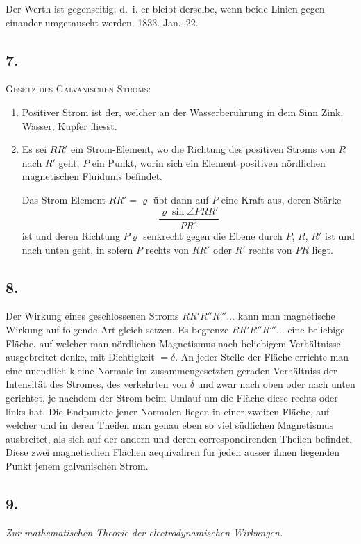 \documentclass[fontsize=10pt,paper=a5,pagesize=auto]{scrbook}
\newcommand{\origpage}[1]{\marginpar{\footnotesize\textit{S. #1}}}
\begin{document}
Der Werth ist gegenseitig, d.~i. er bleibt derselbe, wenn beide Linien gegen einander umgetauscht werden. 1833. Jan.~22.

\subsection*{7.}
\origpage{607}
\textsc{Gesetz des Galvanischen Stroms:}

\begin{enumerate}[label=\arabic*.]
\item Positiver Strom ist der, welcher an der Wasserberührung in dem Sinn Zink, Wasser, Kupfer fliesst.

\item Es sei $RR'$ ein Strom-Element, wo die Richtung des positiven Stroms von $R$ nach $R'$ geht, $P$ ein Punkt, worin sich ein Element positiven nördlichen magnetischen Fluidums befindet.

Das Strom-Element $RR' = \varrho$ übt dann auf $P$ eine Kraft aus, deren Stärke
\[
\frac{\varrho \sin \angle PRR'}{PR^2}
\]
ist und deren Richtung $P\varrho$ senkrecht gegen die Ebene durch $P$, $R$, $R'$ ist und nach unten geht, in sofern $P$ rechts von $RR'$ oder $R'$ rechts von $PR$ liegt.
\end{enumerate}

\subsection*{8.}
\origpage{608}
Der Wirkung eines geschlossenen Stroms $RR'R''R'''\dots$ kann man magnetische Wirkung auf folgende Art gleich setzen. Es begrenze $RR'R''R'''\dots$ eine beliebige Fläche, auf welcher man nördlichen Magnetismus nach beliebigem Verhältnisse ausgebreitet denke, mit Dichtigkeit $= \delta$. An jeder Stelle der Fläche errichte man eine unendlich kleine Normale im zusammengesetzten geraden Verhältniss der Intensität des Stromes, des verkehrten von $\delta$ und zwar nach oben oder nach unten gerichtet, je nachdem der Strom beim Umlauf um die Fläche diese rechts oder links hat. Die Endpunkte jener Normalen liegen in einer zweiten Fläche, auf welcher und in deren Theilen man genau eben so viel südlichen Magnetismus ausbreitet, als sich auf der andern und deren correspondirenden Theilen befindet. Diese zwei magnetischen Flächen aequivaliren für jeden ausser ihnen liegenden Punkt jenem galvanischen Strom.

\subsection*{9.}
\origpage{608}
\textit{Zur mathematischen Theorie der electrodynamischen Wirkungen.}
\end{document}
